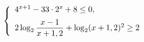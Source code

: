 \begin{ex}[type=ineq_system]
	\begin{condition}
		\( \left\{
		\begin{array}{l}
			4^{x+1}-33\cdot2^x+8\le0,\vspace{2mm}\\
			2\log_2\dfrac{x-1}{x+1,2}+\log_2(x+1,2)^2\ge2
		\end{array}
		\right. \)
	\end{condition}
	\answer{\( [-2;-1,2)\cup{3} \)}
\end{ex}